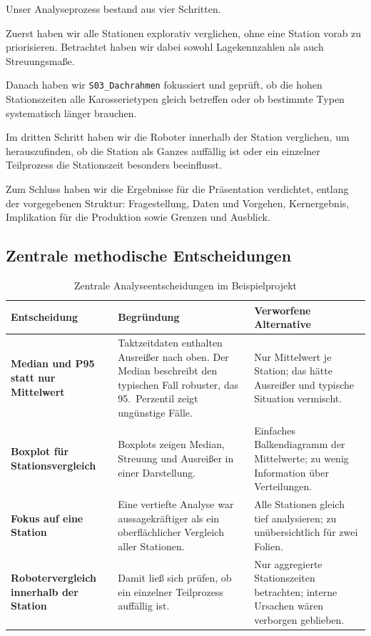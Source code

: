 \documentclass[a4paper, 11pt]{article}
\begin{document}
Unser Analyseprozess bestand aus vier Schritten.

Zuerst haben wir alle Stationen explorativ verglichen, ohne eine Station vorab zu priorisieren. Betrachtet haben wir dabei sowohl Lagekennzahlen als auch Streuungsmaße.

Danach haben wir \texttt{S03\_Dachrahmen} fokussiert und geprüft, ob die hohen Stationszeiten alle Karosserietypen gleich betreffen oder ob bestimmte Typen systematisch länger brauchen.

Im dritten Schritt haben wir die Roboter innerhalb der Station verglichen, um herauszufinden, ob die Station als Ganzes auffällig ist oder ein einzelner Teilprozess die Stationszeit besonders beeinflusst.

Zum Schluss haben wir die Ergebnisse für die Präsentation verdichtet, entlang der vorgegebenen Struktur: Fragestellung, Daten und Vorgehen, Kernergebnis, Implikation für die Produktion sowie Grenzen und Ausblick.

\subsection{Zentrale methodische Entscheidungen}

\begin{table}[htbp]
\centering
\caption{Zentrale Analyseentscheidungen im Beispielprojekt}
\begin{tabular}{p{3.6cm}p{5.2cm}p{5.2cm}}
\hline
\textbf{Entscheidung} & \textbf{Begründung} & \textbf{Verworfene Alternative} \\
\hline
\textbf{Median und P95 statt nur Mittelwert} & Taktzeitdaten enthalten Ausreißer nach oben. Der Median beschreibt den typischen Fall robuster, das 95.\ Perzentil zeigt ungünstige Fälle. & Nur Mittelwert je Station; das hätte Ausreißer und typische Situation vermischt. \\
\hline
\textbf{Boxplot für Stationsvergleich} & Boxplots zeigen Median, Streuung und Ausreißer in einer Darstellung. & Einfaches Balkendiagramm der Mittelwerte; zu wenig Information über Verteilungen. \\
\hline
\textbf{Fokus auf eine Station} & Eine vertiefte Analyse war aussagekräftiger als ein oberflächlicher Vergleich aller Stationen. & Alle Stationen gleich tief analysieren; zu unübersichtlich für zwei Folien. \\
\hline
\textbf{Robotervergleich innerhalb der Station} & Damit ließ sich prüfen, ob ein einzelner Teilprozess auffällig ist. & Nur aggregierte Stationszeiten betrachten; interne Ursachen wären verborgen geblieben. \\
\hline
\end{tabular}
\end{table}
\end{document}
